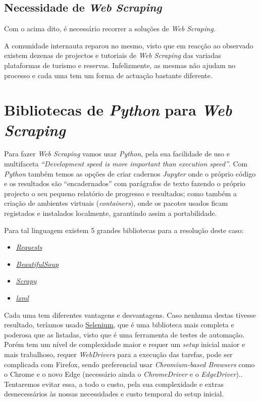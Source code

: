 \subsection{Necessidade de \textit{Web Scraping}}

Com o acima dito, é necessário recorrer a soluções de \textit{Web Scraping}.

A comunidade internauta reparou no mesmo, visto que em reacção ao observado existem dezenas de projectos e tutoriais de \textit{Web Scraping} das variadas plataformas de turismo e reservas.
Infelizmente, as mesmas não ajudam no processo e cada uma tem um forma de actuação bastante diferente.

\section{Bibliotecas de \textit{Python} para \textit{Web Scraping}}

Para fazer \textit{Web Scraping} vamos usar \textit{Python}, pela sua facilidade de uso e multifaceta \textit{``Development speed is more important than execution speed''}.
Com \textit{Python} também temos as opções de criar cadernos \textit{Jupyter} onde o próprio código e os resultados são ``encadernados'' com parágrafos de texto fazendo o próprio projecto o seu pequeno relatório de progresso e resultados; como também a criação de ambientes virtuais (\textit{containers}), onde os pacotes usados ficam registados e instalados localmente, garantindo assim a portabilidade.

Para tal linguagem existem 5 grandes bibliotecas para a resolução deste caso:
\begin{itemize}
  \setlength\itemsep{0.05em}
  \item \textit{\href{https://pypi.org/project/requests/}{Requests}}
  \item \textit{\href{https://pypi.org/project/BeautifulSoup/}{BeautifulSoup}}
  \item \textit{\href{https://pypi.org/project/Scrapy3/}{Scrapy}}
  \item \textit{\href{https://pypi.org/project/lxml/}{lxml}}
\end{itemize}

Cada uma tem diferentes vantagens e desvantagens.
Caso nenhuma destas tivesse resultado, teríamos usado \href{https://pypi.org/project/selenium/}{Selenium}, que é uma biblioteca mais completa e poderosa que as listadas, visto que é uma ferramenta de testes de automação.
Porém tem um nível de complexidade maior e requer um \textit{setup} inicial maior e mais trabalhoso, requer \textit{WebDrivers} para a execução das tarefas, pode ser complicada com Firefox, sendo preferencial usar \textit{Chromium-based Browsers} como o Chrome e o novo Edge (necessário ainda o \textit{ChromeDriver} e o \textit{EdgeDriver})..
Tentaremos evitar essa, a todo o custo, pela sua complexidade e extras desnecessários às nossas necessidades e custo temporal do setup inicial.

